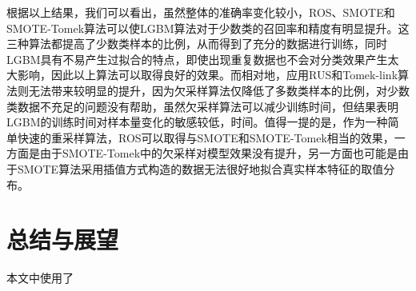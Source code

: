 \documentclass[a4papper]{article}
\begin{document}
\par\setlength{\parindent}{2em} %
根据以上结果，我们可以看出，虽然整体的准确率变化较小，ROS、SMOTE和SMOTE-Tomek算法可以使LGBM算法对于少数类的召回率和精度有明显提升。这三种算法都提高了少数类样本的比例，从而得到了充分的数据进行训练，同时LGBM具有不易产生过拟合的特点，即使出现重复数据也不会对分类效果产生太大影响，因此以上算法可以取得良好的效果。而相对地，应用RUS和Tomek-link算法则无法带来较明显的提升，因为欠采样算法仅降低了多数类样本的比例，对少数类数据不充足的问题没有帮助，虽然欠采样算法可以减少训练时间，但结果表明LGBM的训练时间对样本量变化的敏感较低，时间。值得一提的是，作为一种简单快速的重采样算法，ROS可以取得与SMOTE和SMOTE-Tomek相当的效果，一方面是由于SMOTE-Tomek中的欠采样对模型效果没有提升，另一方面也可能是由于SMOTE算法采用插值方式构造的数据无法很好地拟合真实样本特征的取值分布。

\section{总结与展望}
 \par\setlength{\parindent}{2em} %
 本文中使用了



\end{document}
